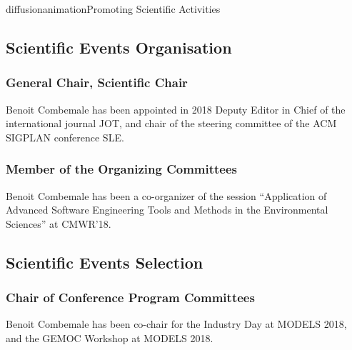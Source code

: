 \documentclass{ra2018}
\begin{document}
\begin{module}{diffusion}{animation}{Promoting Scientific Activities}



\subsection{Scientific Events Organisation}
    \subsubsection{General Chair, Scientific Chair}
    

Benoit Combemale has been appointed in 2018 Deputy Editor in Chief of the international journal JOT, and chair of the steering committee of the ACM SIGPLAN conference SLE.

    \subsubsection{Member of the Organizing Committees}
    
Benoit Combemale has been a co-organizer of the session “Application of Advanced Software Engineering Tools and Methods in the Environmental Sciences” at CMWR’18.
    
\subsection {Scientific Events Selection}

    \subsubsection{Chair of Conference Program Committees}
    
Benoit Combemale has been co-chair for the Industry Day at MODELS 2018, and the GEMOC Workshop at MODELS 2018. 
    

\end{module}
\end{document}
